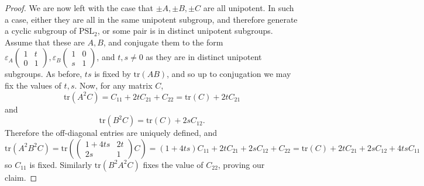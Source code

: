 \documentclass[letterpaper]{amsart}
\begin{document}
\begin{proof}
    We are now left with the case that $\pm A,\pm B,\pm C$ are all unipotent. In such a case, either they are all in the same unipotent subgroup, and therefore generate a cyclic subgroup of $\mathrm{PSL}_2$, or some pair is in distinct unipotent subgroups. Assume that these are $A,B$, and conjugate them to the form $\varepsilon_A\begin{pmatrix}1 & t \\ 0 & 1\end{pmatrix},\varepsilon_B\begin{pmatrix}1 & 0 \\ s & 1\end{pmatrix}$, and $t,s\neq 0$ as they are in distinct unipotent subgroups. As before, $ts$ is fixed by $\mathrm{tr}(AB)$, and so up to conjugation we may fix the values of $t,s$. Now, for any matrix $C$,
    $$\mathrm{tr}(A^2C) = C_{11} + 2tC_{21} + C_{22} = \mathrm{tr}(C) + 2tC_{21}$$ and $$\mathrm{tr}(B^2C) = \mathrm{tr}(C) + 2sC_{12}.$$ Therefore the off-diagonal entries are uniquely defined, and $$\mathrm{tr}(A^2B^2C) = \mathrm{tr}\left(\begin{pmatrix}1 + 4ts &  2t \\ 2s & 1\end{pmatrix}C\right) = (1+4ts)C_{11} + 2tC_{21} + 2sC_{12} + C_{22} = \mathrm{tr}(C) + 2tC_{21} + 2sC_{12} + 4tsC_{11}$$ so $C_{11}$ is fixed. Similarly $\mathrm{tr}(B^2A^2C)$ fixes the value of $C_{22}$, proving our claim.
\end{proof}
\end{document}
